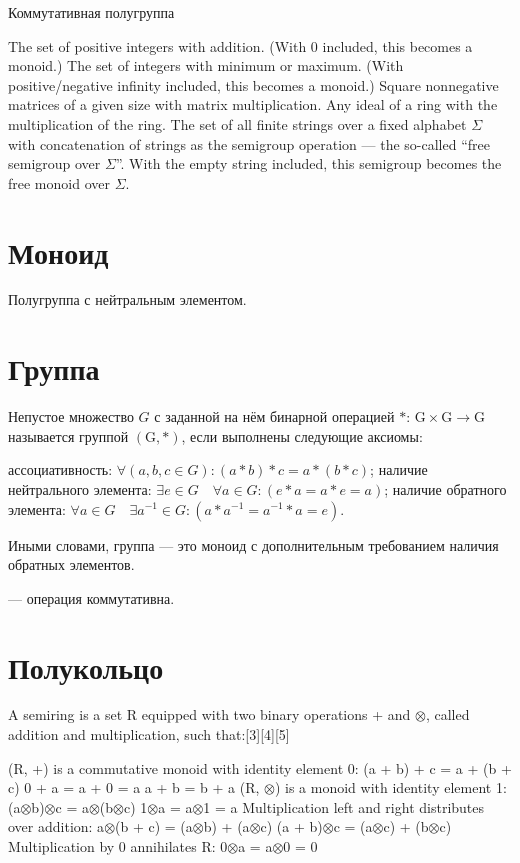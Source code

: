 Коммутативная полугруппа


The set of positive integers with addition. (With 0 included, this becomes a monoid.)
The set of integers with minimum or maximum. (With positive/negative infinity included, this becomes a monoid.)
Square nonnegative matrices of a given size with matrix multiplication.
Any ideal of a ring with the multiplication of the ring.
The set of all finite strings over a fixed alphabet $\Sigma$ with concatenation of strings as the semigroup operation — the so-called ``free semigroup over $\Sigma$''. With the empty string included, this semigroup becomes the free monoid over $\Sigma$.


\section{Моноид}


Полугруппа с нейтральным элементом.



\section{Группа}


Непустое множество $G$ с заданной на нём бинарной операцией $*$: $ \mathrm {G} \times \mathrm {G} \rightarrow \mathrm {G}$ называется группой $ (\mathrm {G} ,*)$, если выполнены следующие аксиомы:

ассоциативность: $\forall (a,b,c\in G)\colon (a*b)*c=a*(b*c)$;
наличие нейтрального элемента: $ \exists e\in G\quad \forall a\in G\colon (e*a=a*e=a)$;
наличие обратного элемента: $ \forall a\in G\quad \exists a^{-1}\in G\colon (a*a^{-1}=a^{-1}*a=e)$.

Иными словами, группа --- это моноид с дополнительным требованием наличия обратных элементов.

\begin{definition} --- операция коммутативна.
\end{definition}


\section{Полукольцо}

A semiring is a set R equipped with two binary operations + and $\otimes$, called addition and multiplication, such that:[3][4][5]

(R, +) is a commutative monoid with identity element 0:
(a + b) + c = a + (b + c)
0 + a = a + 0 = a
a + b = b + a
(R, $\otimes$) is a monoid with identity element 1:
(a$\otimes$b)$\otimes$c = a$\otimes$(b$\otimes$c)
1$\otimes$a = a$\otimes$1 = a
Multiplication left and right distributes over addition:
a$\otimes$(b + c) = (a$\otimes$b) + (a$\otimes$c)
(a + b)$\otimes$c = (a$\otimes$c) + (b$\otimes$c)
Multiplication by 0 annihilates R:
0$\otimes$a = a$\otimes$0 = 0


